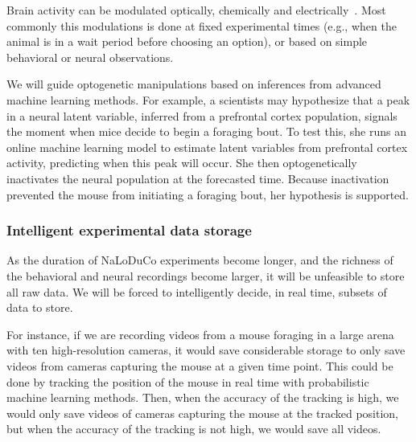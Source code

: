 \documentclass[12pt]{article}
\begin{document}
Brain activity can be modulated optically, chemically and
electrically~\citep{}.
%
Most commonly this modulations is done at fixed experimental times (e.g., when
the animal is in a wait period before choosing an option), or based on simple
behavioral or neural observations.

We will guide optogenetic manipulations based on inferences from advanced
machine learning methods.
%
For example, a scientists may hypothesize that a peak in a neural latent
variable, inferred from a prefrontal cortex population, signals the moment when
mice decide to begin a foraging bout.  To test this, she runs an online machine
learning model to estimate latent variables from prefrontal cortex activity,
predicting when this peak will occur. She then optogenetically inactivates the
neural population at the forecasted time.  Because inactivation prevented the
mouse from initiating a foraging bout, her hypothesis is supported.

\subsubsection*{Intelligent experimental data storage}

As the duration of NaLoDuCo experiments become longer, and the richness of the                                                              
behavioral and neural recordings become larger, it will be unfeasible to                                                                
store all raw data. We will be forced to intelligently decide, in real time,                                                                
subsets of data to store.
                                                                                                                                            
For instance, if we are recording videos from a mouse foraging in a large arena
with ten high-resolution cameras, it would save considerable storage to only
save videos from cameras capturing the mouse at a given time point. This could
be done by tracking the position of the mouse in real time with probabilistic
machine learning methods. Then, when the accuracy of the tracking is high, we would only save
videos of cameras capturing the mouse at the tracked position, but when the
accuracy of the tracking is not high, we would save all videos.

\end{document}
